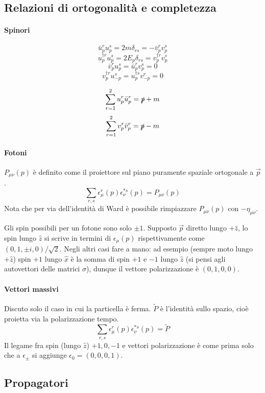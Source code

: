 \documentclass[12pt,a4paper]{article}
\begin{document}
	\subsection{Relazioni di ortogonalità e completezza}
	\paragraph{Spinori}
	\[ \bar{u}_p^r u_p^s = 2m \delta_{rs} = - \bar{v}_p^r v_p^s \]
	\[ u_p^{\dagger r} u_p^s = 2E_p \delta_{rs} = v_p^{\dagger r} v_p^s \]
	\[ \bar{v}_p^r u_p^s = \bar{u}_p^r v_p^s = 0 \]
	\[ v_p^{\dagger r} u_{-p}^s = u_p^{\dagger s} v_{-p}^r = 0 \]
	
	\[ \sum_{r=1}^{2} u^r_p\bar{u}^r_p = \slashed{p} + m \]
	\[ \sum_{r=1}^{2} v^r_p\bar{v}^r_p = \slashed{p} - m \]
	
	\paragraph{Fotoni}
	$P_{\mu\nu}(p)$ è definito come il proiettore sul piano puramente spaziale ortogonale a $\vec{p}$.
	\[ \sum_{r,s}\epsilon^r_\mu(p)\epsilon^{*s}_\nu(p) = P_{\mu\nu}(p) \]
	Nota che per via dell'identità di Ward è possibile rimpiazzare $P_{\mu\nu}(p)$ con $-\eta_{\mu\nu}$.
	
	Gli spin possibili per un fotone sono solo $\pm 1$. Supposto $\vec{p}$ diretto lungo $+\hat{z}$, lo spin lungo $\hat{z}$ si scrive in termini di $\epsilon_\mu(p)$ rispettivamente come $(0, 1, \pm i, 0)/\sqrt{2}$. Negli altri casi fare a mano: ad esempio (sempre moto lungo $+\hat{z}$) spin $+1$ lungo $\hat{x}$ è la somma di spin $+1$ e $-1$ lungo $\hat{z}$ (si pensi agli autovettori delle matrici $\sigma$), dunque il vettore polarizzazione è $(0, 1, 0, 0)$.
	
	\paragraph{Vettori massivi}
	Discuto solo il caso in cui la particella è ferma. $\tilde{P}$ è l'identità sullo spazio, cioè proietta via la polarizzazione tempo.
	\[ \sum_{r,s}\epsilon^r_\mu(p)\epsilon^{*s}_\nu(p) = \tilde{P} \]
	Il legame fra spin (lungo $\hat{z}$) $+1,0,-1$ e vettori polarizzazione è come prima solo che a $\epsilon_\pm$ si aggiunge $\epsilon_0 = (0,0,0,1)$.
	
	\subsection{Propagatori}
	
\end{document}
